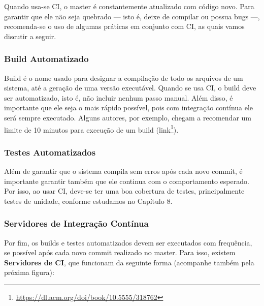 \documentclass[
  11pt,
  twoside]{book}
\DeclareRobustCommand{\href}[2]{#2\footnote{\url{#1}}}
\begin{document}
Quando usa-se CI, o master é constantemente atualizado com código novo.
Para garantir que ele não seja quebrado --- isto é, deixe de compilar ou
possua bugs ---, recomenda-se o uso de algumas práticas em conjunto com
CI, as quais vamos discutir a seguir.

\hypertarget{build-automatizado}{%
\subsubsection*{Build Automatizado}\label{build-automatizado}}

Build é o nome usado para designar a compilação de todo os arquivos de
um sistema, até a geração de uma versão executável. Quando se usa CI, o
build deve ser automatizado, isto é, não incluir nenhum passo manual.
Além disso, é importante que ele seja o mais rápido possível, pois com
integração contínua ele será sempre executado. Alguns autores, por
exemplo, chegam a recomendar um limite de 10 minutos para execução de um
build (\href{https://dl.acm.org/doi/book/10.5555/318762}{link}).

\hypertarget{testes-automatizados}{%
\subsubsection*{Testes Automatizados}\label{testes-automatizados}}

Além de garantir que o sistema compila sem erros após cada novo commit,
é importante garantir também que ele continua com o comportamento
esperado. Por isso, ao usar CI, deve-se ter uma boa cobertura de testes,
principalmente testes de unidade, conforme estudamos no Capítulo 8.

\hypertarget{servidores-de-integrauxe7uxe3o-contuxednua}{%
\subsubsection*{Servidores de Integração
Contínua}\label{servidores-de-integrauxe7uxe3o-contuxednua}}


Por fim, os builds e testes automatizados devem ser executados com
frequência, se possível após cada novo commit realizado no master. Para
isso, existem \textbf{Servidores de CI}, que funcionam da seguinte forma
(acompanhe também pela próxima figura):
\end{document}
